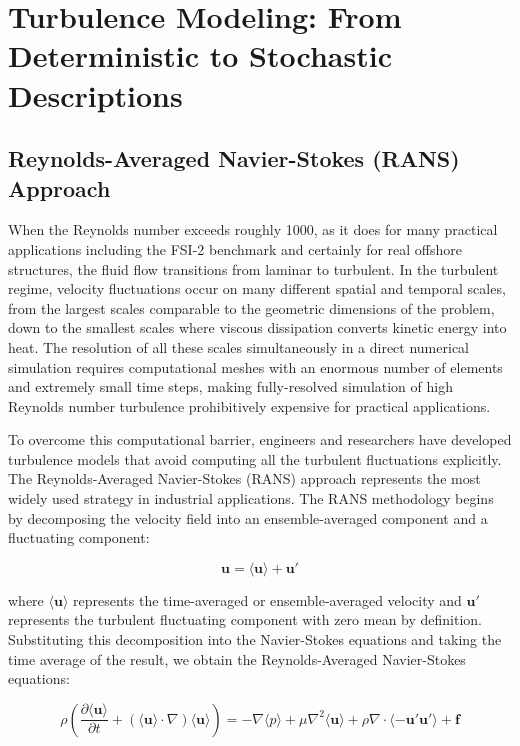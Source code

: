 ﻿\documentclass[a4paper,11pt]{article}
\theoremstyle{definition}
\begin{document}
\section{Turbulence Modeling: From Deterministic to Stochastic Descriptions}

\subsection{Reynolds-Averaged Navier-Stokes (RANS) Approach}

When the Reynolds number exceeds roughly 1000, as it does for many practical applications including the FSI-2 benchmark and certainly for real offshore structures, the fluid flow transitions from laminar to turbulent. In the turbulent regime, velocity fluctuations occur on many different spatial and temporal scales, from the largest scales comparable to the geometric dimensions of the problem, down to the smallest scales where viscous dissipation converts kinetic energy into heat. The resolution of all these scales simultaneously in a direct numerical simulation requires computational meshes with an enormous number of elements and extremely small time steps, making fully-resolved simulation of high Reynolds number turbulence prohibitively expensive for practical applications.

To overcome this computational barrier, engineers and researchers have developed turbulence models that avoid computing all the turbulent fluctuations explicitly. The Reynolds-Averaged Navier-Stokes (RANS) approach represents the most widely used strategy in industrial applications. The RANS methodology begins by decomposing the velocity field into an ensemble-averaged component and a fluctuating component:

\begin{equation}
\mathbf{u} = \langle \mathbf{u} \rangle + \mathbf{u}'
\label{eq:reynolds_decomposition}
\end{equation}

where $\langle \mathbf{u} \rangle$ represents the time-averaged or ensemble-averaged velocity and $\mathbf{u}'$ represents the turbulent fluctuating component with zero mean by definition. Substituting this decomposition into the Navier-Stokes equations and taking the time average of the result, we obtain the Reynolds-Averaged Navier-Stokes equations:

\begin{equation}
\rho \left( \frac{\partial \langle \mathbf{u} \rangle}{\partial t} + (\langle \mathbf{u} \rangle \cdot \nabla) \langle \mathbf{u} \rangle \right) = -\nabla \langle p \rangle + \mu \nabla^2 \langle \mathbf{u} \rangle + \rho \nabla \cdot \langle -\mathbf{u}' \mathbf{u}' \rangle + \mathbf{f}
\label{eq:rans}
\end{equation}
\end{document}
